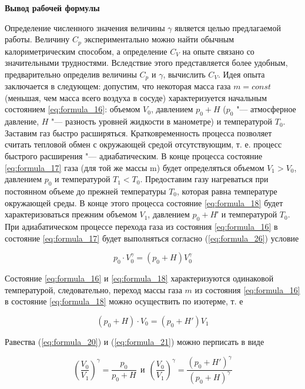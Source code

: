 \begin{center}
    \textbf{Вывод рабочей формулы}
\end{center}

Определение численного значения величины $\gamma$ является целью предлагаемой работы. Величину $C_p$ экспериментально можно найти обычным калориметрическим способом, а определение $C_V$ на опыте связано со значительными трудностями. Вследствие этого представляется более удобным, предварительно определив величины $C_p$ и $\gamma$, вычислить $C_V$. Идея опыта заключается в следующем: допустим, что некоторая масса газа $m = const$ (меньшая, чем масса всего воздуха в сосуде) характеризуется начальным состоянием \ref{eq:formula_16}: объемом $V_0$, давлением $p_0 + H$ ($p_0$ "--- атмосферное давление, $H$ "--- разность уровней жидкости в манометре) и температурой $T_0$. Заставим газ быстро расширяться. Кратковременность процесса позволяет считать тепловой обмен с окружающей средой отсутствующим, т. е. процесс быстрого расширения "--- адиабатическим. В конце процесса состояние \ref{eq:formula_17} газа (для той же массы m) будет определяться объемом $V_1 > V_0$, давлением $p_0$ и температурой $T_1 < T_0$. Предоставим газу нагреваться при постоянном объеме до прежней температуры $T_0$, которая равна температуре окружающей среды. В конце этого процесса состояние \ref{eq:formula_18} будет характеризоваться прежним объемом $V_1$, давлением $p_0 + H$′ и температурой $T_0$. При адиабатическом процессе перехода газа из состояния \ref{eq:formula_16} в состояние \ref{eq:formula_17} будет выполняться согласно (\ref{eq:formula_26}) условие

\begin{equation}
    p_0 \cdot V_0^ \gamma = \left (p_0 +H \right ) V_0^ \gamma
    \label{eq:formula_20}
\end{equation}

Состояние \ref{eq:formula_16} и \ref{eq:formula_18} характеризуются одинаковой температурой, следовательно, переход массы газа $m$ из состояния \ref{eq:formula_16} в состояние \ref{eq:formula_18} можно осуществить по изотерме, т. е

\begin{equation}
    \left (p_0 + H \right ) \cdot V_0 = \left (p_0 +H' \right ) V_1
    \label{eq:formula_21}
\end{equation}

Равества (\ref{eq:formula_20}) и (\ref{eq:formula_21}) можно перписать в виде

\begin{equation}
    \left (\frac{V_0}{V_1} \right )^ \gamma = \frac{p_0}{p_0 + H} 
    ~~ \text{и} ~~ 
    \left (\frac{V_0}{V_1} \right )^ \gamma = \frac{\left (p_0 + H' \right )^ \gamma}{\left (p_0 + H \right )^ \gamma}
    \label{eq:formula_22}
\end{equation}


